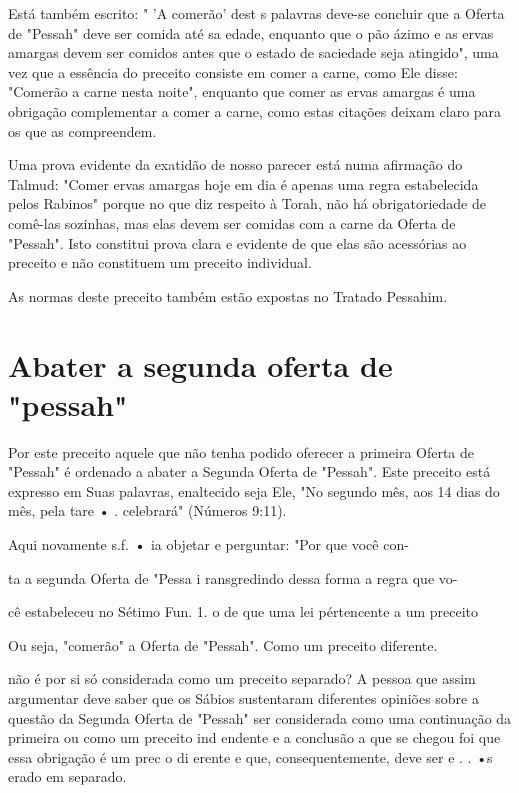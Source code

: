 \begin{itemize}
\begin{enumrate}
\begin{itemize}
\begin{itemize}
Está também escrito: " 'A comerão' dest s palavras deve-se concluir que
a Oferta de "Pessah" deve ser comida até sa edade, enquanto que o pão
ázimo e as ervas amargas devem ser comidos antes que o estado de
saciedade seja atingido", uma vez que a essência do preceito consiste em
comer a carne, como Ele disse: "Comerão a carne nesta noite", enquanto
que comer as ervas amargas é uma obrigação complementar a comer a carne,
como estas citações deixam claro para os que as compreendem.

Uma prova evidente da exatidão de nosso parecer está numa afirma­ção do
Talmud: "Comer ervas amargas hoje em dia é apenas uma regra
estabe­lecida pelos Rabinos" porque no que diz respeito à Torah, não há
obrigatorie­dade de comê-las sozinhas, mas elas devem ser comidas com a
carne da Oferta de "Pessah". Isto constitui prova clara e evidente de
que elas são acessórias ao preceito e não constituem um preceito
individual.


As normas deste preceito também estão expostas no Tratado Pessahim.

\section{Abater a segunda oferta de "pessah"}


Por este preceito aquele que não tenha podido oferecer a primeira Oferta
de "Pessah" é ordenado a abater a Segunda Oferta de "Pessah". Este
preceito está expresso em Suas palavras, enaltecido seja Ele, "No
segundo mês, aos 14 dias do mês, pela tare • . celebrará" (Números
9:11).


Aqui novamente s.f. \textbf{•} ia objetar e perguntar: "Por que você
con-


ta a segunda Oferta de "Pessa i ransgredindo dessa forma a regra que vo-

cê estabeleceu no Sétimo Fun. 1. o de que uma lei
pértencente a um preceito



Ou seja, "comerão" a Oferta de "Pessah".
Como um preceito diferente.


não é por si só considerada como um preceito separado? A pessoa que
assim argumentar deve saber que os Sábios sustentaram diferentes
opiniões sobre a questão da Segunda Oferta de "Pessah" ser considerada
como uma continua­ção da primeira ou como um preceito ind endente e a
conclusão a que se che­gou foi que essa obrigação é um prec o di erente
e que, consequentemente, deve ser e . . •s erado em separado.



\end{itemize}
\end{itemize}
\end{enumrate}
\end{itemize}
